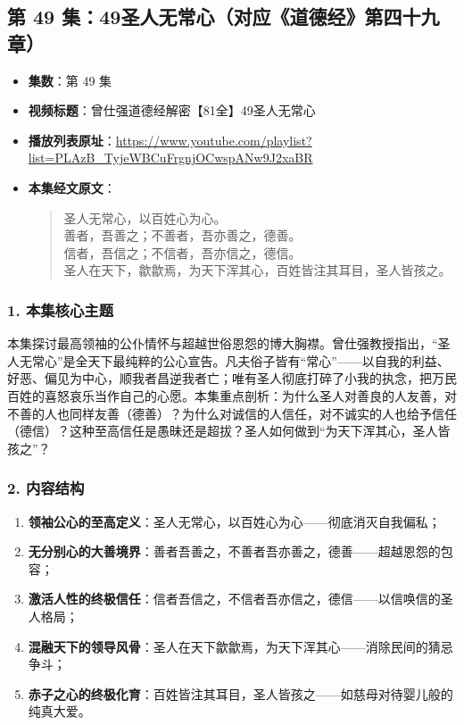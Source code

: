 \clearpage

\subsection{第 49 集：49圣人无常心（对应《道德经》第四十九章）}
\label{sec:ep49}

\begin{itemize}
    \item \textbf{集数}：第 49 集
    \item \textbf{视频标题}：曾仕强道德经解密【81全】49圣人无常心
    \item \textbf{播放列表原址}：\url{https://www.youtube.com/playlist?list=PLAzB_TyjeWBCuFrgnjOCwspANw9J2xaBR}
    \item \textbf{本集经文原文}：
    \begin{quote}\kaishu
    圣人无常心，以百姓心为心。\\
    善者，吾善之；不善者，吾亦善之，德善。\\
    信者，吾信之；不信者，吾亦信之，德信。\\
    圣人在天下，歙歙焉，为天下浑其心，百姓皆注其耳目，圣人皆孩之。
    \end{quote}
\end{itemize}

\subsubsection{1. 本集核心主题}
本集探讨最高领袖的公仆情怀与超越世俗恩怨的博大胸襟。曾仕强教授指出，“圣人无常心”是全天下最纯粹的公心宣告。凡夫俗子皆有“常心”——以自我的利益、好恶、偏见为中心，顺我者昌逆我者亡；唯有圣人彻底打碎了小我的执念，把万民百姓的喜怒哀乐当作自己的心愿。本集重点剖析：为什么圣人对善良的人友善，对不善的人也同样友善（德善）？为什么对诚信的人信任，对不诚实的人也给予信任（德信）？这种至高信任是愚昧还是超拔？圣人如何做到“为天下浑其心，圣人皆孩之”？

\subsubsection{2. 内容结构}
\begin{enumerate}
    \item \textbf{领袖公心的至高定义}：圣人无常心，以百姓心为心——彻底消灭自我偏私；
    \item \textbf{无分别心的大善境界}：善者吾善之，不善者吾亦善之，德善——超越恩怨的包容；
    \item \textbf{激活人性的终极信任}：信者吾信之，不信者吾亦信之，德信——以信唤信的圣人格局；
    \item \textbf{混融天下的领导风骨}：圣人在天下歙歙焉，为天下浑其心——消除民间的猜忌争斗；
    \item \textbf{赤子之心的终极化育}：百姓皆注其耳目，圣人皆孩之——如慈母对待婴儿般的纯真大爱。
\end{enumerate}

